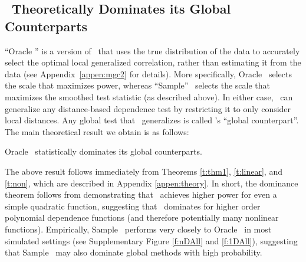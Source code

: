 \documentclass[11pt]{article}
\begin{document}
\subsection*{\Mgc~Theoretically Dominates its Global Counterparts }
\label{s:theory}

``Oracle \Mgc'' is a version of \Mgc~that uses the true distribution of the data to accurately select the optimal local generalized correlation, rather than estimating it from the data (see Appendix~\ref{appen:mgc2} for details). More specifically, Oracle \Mgc~selects the scale that maximizes power, whereas ``Sample'' \Mgc~selects the scale that maximizes the smoothed test statistic (as described above). 
In either case,  \Mgc~can generalize any distance-based dependence test by restricting it to only consider local distances.  Any global test that \Mgc~generalizes is called \Mgc's ``global counterpart''.  The main theoretical result we obtain is as follows:
% 
\begin{thm} \label{t:dominate}
Oracle \Mgc~statistically dominates its global counterparts. 
% 
% 
\end{thm}

The above result follows immediately from Theorems \ref{t:thm1}, \ref{t:linear}, and \ref{t:non}, which are described in Appendix \ref{appen:theory}. In short, the dominance theorem follows from demonstrating that \Mgc~achieves higher power for even a simple quadratic function, suggesting that \Mgc~dominates for higher order polynomial dependence functions (and therefore potentially many nonlinear functions).
Empirically, Sample \Mgc~performs very closely to Oracle \Mgc~in most simulated settings (see Supplementary Figure \ref{f:nDAll} and \ref{f:1DAll}), suggesting that Sample \Mgc~may also dominate global methods with high probability. 
\end{document}
